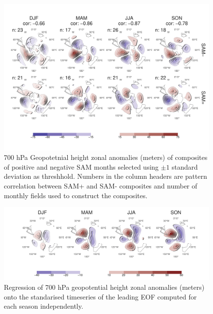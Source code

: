\documentclass[]{ametsocV5}
\begin{document}
\begin{figure}
\includegraphics{A9-1} \caption[700 hPa Geopotetnial height zonal anomalies (meters) of composites of positive and negative SAM months selected using $\pm1$ standard deviation as threshhold]{700 hPa Geopotetnial height zonal anomalies (meters) of composites of positive and negative SAM months selected using $\pm1$ standard deviation as threshhold. Numbers in the column headers are pattern correlation between SAM+ and SAM- composites and number of monthly fields used to construct the composites.}\label{fig:A9}
\end{figure}

\begin{figure}
\includegraphics{A10-1} \caption[Regression of 700 hPa geopotential height zonal anomalies (meters) onto the standarised timeseries of the leading EOF computed for each season independently]{Regression of 700 hPa geopotential height zonal anomalies (meters) onto the standarised timeseries of the leading EOF computed for each season independently.}\label{fig:A10}
\end{figure}
\end{document}
